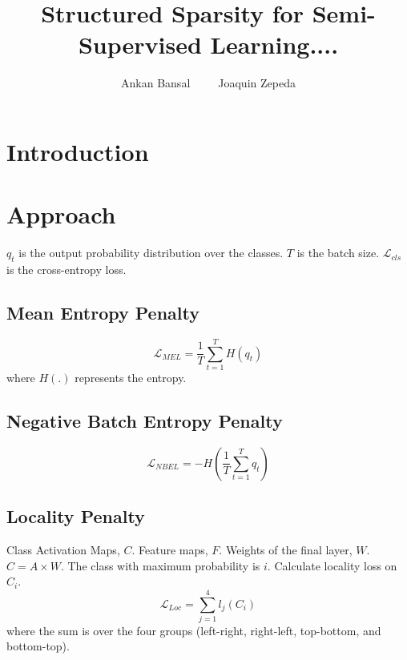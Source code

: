 \documentclass[runningheads]{llncs}
\begin{document}
%
\title{Structured Sparsity for Semi-Supervised Learning....} 

\titlerunning{}
%
\author{Ankan Bansal~~~~~Joaquin Zepeda}

%
\maketitle              %

\section{Introduction}

\section{Approach}

$q_t$ is the output probability distribution over the classes. $T$ is the batch size.
$\mathcal{L}_{cls}$ is the cross-entropy loss. 

\subsection{Mean Entropy Penalty}
\begin{equation}
	\mathcal{L}_{MEL} = \frac{1}{T}\sum_{t=1}^{T}H(q_t)
\end{equation}
where $H(.)$ represents the entropy. 

\subsection{Negative Batch Entropy Penalty}
\begin{equation}
	\mathcal{L}_{NBEL} = -H(\frac{1}{T}\sum_{t=1}^{T}q_t)
\end{equation}

\subsection{Locality Penalty}
Class Activation Maps, $C$. Feature maps, $F$. Weights of the final layer, $W$. $C = A \times W$.
The class with maximum probability is $i$. Calculate locality loss on $C_i$. 
\begin{equation}
	\mathcal{L}_{Loc} = \sum_{j=1}^{4}l_j(C_i)
\end{equation}
where the sum is over the four groups (left-right, right-left, top-bottom, and bottom-top).
\end{document}
